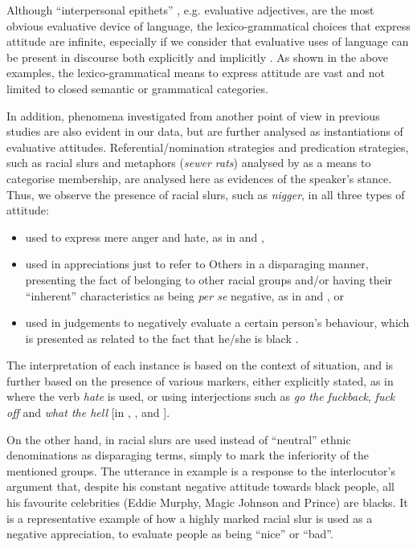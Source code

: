 \documentclass[output=paper]{LSP/langsci}
\begin{document}
Although “interpersonal epithets” \citep[see][376--377]{Halliday2014}, e.g. evaluative adjectives, are the most obvious evaluative device of language, the lexico-grammatical choices that express attitude are infinite, especially if we consider that evaluative uses of language can be present in discourse both explicitly and implicitly \citep[see][23] {Munday2012}. As shown in the above examples, the lexico-grammatical means to express attitude are vast and not limited to closed semantic or grammatical categories.

In addition, phenomena investigated from another point of view in previous studies are also evident in our data, but are further analysed as instantiations of evaluative attitudes. Referential/nomination strategies and predication strategies, such as racial slurs and metaphors (\textit{sewer rats}) analysed by \citet{Reisigl2001} as a means to categorise membership, are analysed here as evidences of the speaker's stance. Thus, we observe the presence of racial slurs, such as \textit{nigger}, in all three types of attitude:

\begin{itemize}
\item used to express mere anger and hate, as in  and ,
\item used in appreciations just to refer to Others in a disparaging manner, presenting the fact of belonging to other racial groups and/or having their “inherent” characteristics as being \textit{per se} negative, as in  and , or
\item used in judgements to negatively evaluate a certain person's behaviour, which is presented as related to the fact that he/she is black .
\end{itemize}

The interpretation of each instance is based on the context of situation, and is further based on the presence of various markers, either explicitly stated, as in  where the verb \textit{hate} is used, or using interjections such as \textit{go the fuckback}, \textit{fuck off} and \textit{what the hell} [in , , and ].

On the other hand, in  racial slurs are used instead of “neutral” ethnic denominations as disparaging terms, simply to mark the inferiority of the mentioned groups. The utterance in example  is a response to the interlocutor's argument that, despite his constant negative attitude towards black people, all his favourite celebrities (Eddie Murphy, Magic Johnson and Prince) are blacks. It is a representative example of how a highly marked racial slur is used as a negative appreciation, to evaluate people as being “nice” or “bad”.
\end{document}
